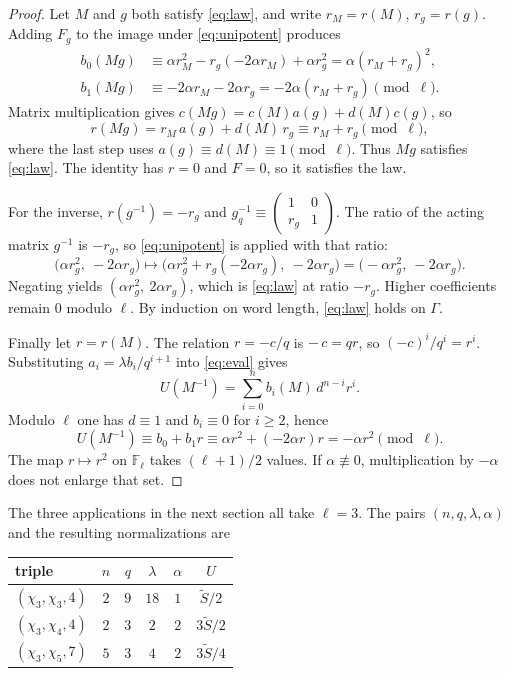 \documentclass[11pt]{article}
\theoremstyle{remark}
\newcommand{\tS}{\widetilde{S}}
\begin{document}
\begin{proof}
Let \(M\) and \(g\) both satisfy \eqref{eq:law}, and write \(r_M=r(M)\), \(r_g=r(g)\).
Adding \(F_g\) to the image under \eqref{eq:unipotent} produces
\begin{align*}
b_0(Mg)
&\equiv\alpha r_M^2-r_g(-2\alpha r_M)+\alpha r_g^2
=\alpha(r_M+r_g)^2,\\
b_1(Mg)
&\equiv -2\alpha r_M-2\alpha r_g
=-2\alpha(r_M+r_g)\pmod{\ell}.
\end{align*}
Matrix multiplication gives \(c(Mg)=c(M)a(g)+d(M)c(g)\), so
\[
r(Mg)=r_M\,a(g)+d(M)\,r_g\equiv r_M+r_g\pmod{\ell},
\]
where the last step uses \(a(g)\equiv d(M)\equiv 1\pmod{\ell}\).
Thus \(Mg\) satisfies \eqref{eq:law}.
The identity has \(r=0\) and \(F=0\), so it satisfies the law.

For the inverse, \(r(g^{-1})=-r_g\) and \(g_q^{-1}\equiv\begin{pmatrix}1&0\\r_g&1\end{pmatrix}\).
The ratio of the acting matrix \(g^{-1}\) is \(-r_g\), so \eqref{eq:unipotent} is applied with that ratio:
\[
\bigl(\alpha r_g^2,\ -2\alpha r_g\bigr)
\longmapsto
\bigl(\alpha r_g^2+r_g(-2\alpha r_g),\ -2\alpha r_g\bigr)
=\bigl(-\alpha r_g^2,\ -2\alpha r_g\bigr).
\]
Negating yields \((\alpha r_g^2,\ 2\alpha r_g)\), which is \eqref{eq:law} at ratio \(-r_g\).
Higher coefficients remain \(0\) modulo \(\ell\).
By induction on word length, \eqref{eq:law} holds on \(\Gamma\).

Finally let \(r=r(M)\).
The relation \(r=-c/q\) is \(-\,c=qr\), so \((-c)^i/q^i=r^i\).
Substituting \(a_i=\lambda b_i/q^{i+1}\) into \eqref{eq:eval} gives
\[
U(M^{-1})=\sum_{i=0}^{n}b_i(M)\,d^{n-i}r^{i}.
\]
Modulo \(\ell\) one has \(d\equiv 1\) and \(b_i\equiv 0\) for \(i\ge 2\), hence
\[
U(M^{-1})\equiv b_0+b_1 r\equiv\alpha r^2+(-2\alpha r)r=-\alpha r^2\pmod{\ell}.
\]
The map \(r\mapsto r^2\) on \(\mathbb{F}_\ell\) takes \((\ell+1)/2\) values.
If \(\alpha\not\equiv 0\), multiplication by \(-\alpha\) does not enlarge that set.
\end{proof}

The three applications in the next section all take \(\ell=3\).
The pairs \((n,q,\lambda,\alpha)\) and the resulting normalizations are

\begin{center}
\begin{tabular}{lccccc}
\hline
triple & \(n\) & \(q\) & \(\lambda\) & \(\alpha\) & \(U\) \\
\hline
\((\chi_3,\chi_3,4)\) & \(2\) & \(9\) & \(18\) & \(1\) & \(\tS/2\) \\
\((\chi_3,\chi_4,4)\) & \(2\) & \(3\) & \(2\) & \(2\) & \(3\tS/2\) \\
\((\chi_3,\chi_5,7)\) & \(5\) & \(3\) & \(4\) & \(2\) & \(3\tS/4\) \\
\hline
\end{tabular}
\end{center}
\end{document}
